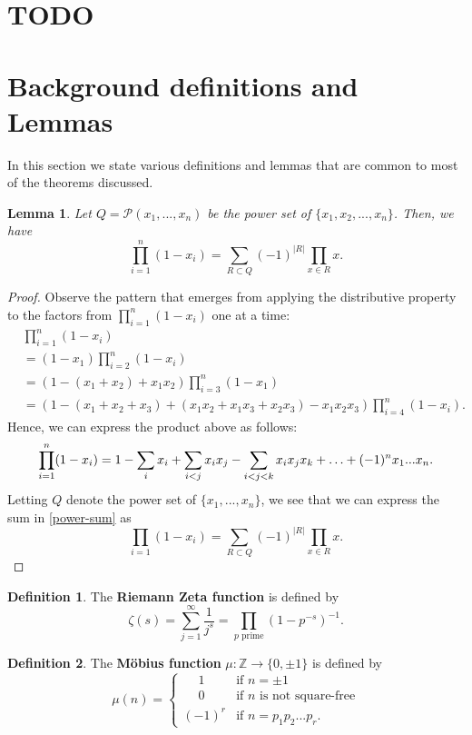 \documentclass[10pt,a4paper]{article}
\newtheorem{lemma}[theorem]{Lemma}
\theoremstyle{definition}
\newtheorem{definition}{Definition}[section]
\theoremstyle{remark}
\begin{document}
	\tableofcontents
	\section{TODO}
	\listoftodos
	\section{Background definitions and Lemmas}
	In this section we state various definitions and lemmas that are common to most of the theorems discussed.
\begin{lemma}\label{alternating-sum-to-prod}
Let $Q = \mathcal{P}(x_1, ..., x_n)$ be the power set of $\{x_1, x_2, ..., x_n\}$. Then, we have
$$\prod_{i=1}^n (1-x_i)=\sum_{R\subset Q}(-1)^{|R|}\prod_{x\in R}x.$$  
\end{lemma}

\begin{proof}
Observe the pattern that emerges from applying the distributive property to the factors from $\prod_{i=1}^n (1-x_i)$ one at a time:
\begin{align*} 
&\prod_{i=1}^n (1-x_i)\\ 
&= (1-x_1)\prod_{i=2}^n(1-x_i)\\
&= (1-(x_1+x_2) + x_1x_2)\prod_{i=3}^n (1-x_1)\\
&=(1-(x_1+x_2+x_3)+(x_1x_2+x_1x_3+x_2x_3)- x_1x_2x_3)\prod_{i=4}^n (1-x_i). 
\end{align*}
Hence, we can express the product above as follows:
\begin{equation}\label{power-sum}
\prod_{i=1}^n (1-x_i) = 1 - \sum_{i}x_i+\sum_{i<j}x_ix_j - \sum_{i<j<k}x_ix_jx_k+\mathellipsis + (-1)^n x_1...x_n.
\end{equation}
Letting $Q$ denote the power set of $\{x_1, ..., x_n\}$, we see that we can express the sum in \cref{power-sum} as
$$\prod_{i=1}(1-x_i)=\sum_{R\subset Q}(-1)^{|R|}\prod_{x\in R}x.$$   
\end{proof}

\begin{definition} \label{riemann-zeta}
The \textbf{Riemann Zeta function} is defined by 
$$\zeta(s)=\sum_{j=1}^{\infty} \frac{1}{j^s}=\prod_{p \text{ prime}}(1-p^{-s})^{-1}.$$
\end{definition}	
	
\begin{definition} \label{mobius}
The \textbf{M\"obius function} $\mu: \mathbb{Z} \to \{0, \pm 1\}$ is defined by
$$\mu(n) =\begin{cases} 
\phantom{-}1      & \text{if }  n=\pm 1 \\
\phantom{-}0      & \text{if }  n \text{ is not square-free}\\
(-1)^r & \text{if }  n=p_1 p_2 ... p_r. 		\end{cases}$$		
\end{definition}
\end{document}
